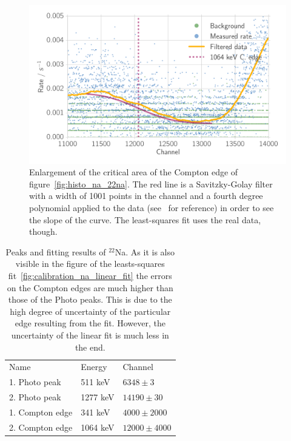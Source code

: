 \begin{figure}[htpb]
    \centering
    \includegraphics[width=0.9\linewidth]{./analysis/figures/histo_na_22na2}
    \caption{Enlargement of the critical area of the Compton edge of
    figure~\ref{fig:histo_na_22na}.     
    The red line is a Savitzky-Golay filter 
    with a width of 1001 points in the channel and a fourth
    degree polynomial applied to the data (see~\cite{scipy} for reference) in order
    to see the slope of the curve. The least-squares fit uses the real data, though.
}
\label{fig:histo_na_22na2}
\end{figure}

\begin{table}[htpb]
    \centering
    \caption{Peaks and fitting results of $^{22}$Na. As it is also visible in the figure
    of the leasts-squares fit~\ref{fig:calibration_na_linear_fit} the errors on the
    Compton edges are much higher than those of the Photo peaks. This is due to the high
    degree of uncertainty of the particular edge resulting from the fit. However, the 
    uncertainty of the linear fit is much less in the end.}
\label{tab:peaks_na_ps}
\begin{tabular}{lll}
    \rowcolor{LightCyan} Name &Energy & Channel \\ 
       1. Photo peak& 511 keV & $6348 \pm 3$ \\ 
       2. Photo peak& 1277 keV & $14190 \pm 30 $\\
       1. Compton edge& 341 keV& $4000 \pm 2000$\\
       2. Compton edge& 1064 keV & $12000 \pm 4000$
    \end{tabular}
\end{table}

